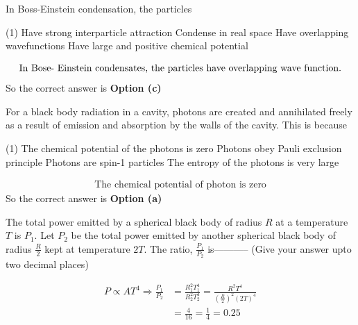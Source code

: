\begin{enumerate}
	\item In Boss-Einstein condensation, the particles
	{}
	\begin{tasks}(1)
		\task[\textbf{a.}] Have strong interparticle attraction
		\task[\textbf{b.}] Condense in real space
		\task[\textbf{c.}]  Have overlapping wavefunctions
		\task[\textbf{d.}] Have large and positive chemical potential
	\end{tasks}
	\begin{answer}
		\begin{align*}
		\intertext{In Bose- Einstein condensates, the particles have overlapping wave function.}
		\end{align*}
		So the correct answer is \textbf{Option (c)}
	\end{answer}
	\begin{minipage}{\textwidth}
		\item For a black body radiation in a cavity, photons are created and annihilated freely as a result of emission and absorption by the walls of the cavity. This is because
		{}
	\end{minipage}
	\begin{tasks}(1)
		\task[\textbf{a.}] The chemical potential of the photons is zero
		\task[\textbf{b.}] Photons obey Pauli exclusion principle
		\task[\textbf{c.}] Photons are spin-1 particles
		\task[\textbf{d.}] The entropy of the photons is very large
	\end{tasks}
	\begin{answer}
		\begin{align*}
		\text{The chemical potential of photon is zero}
		\end{align*}
		So the correct answer is \textbf{Option (a)}
	\end{answer}
	\item The total power emitted by a spherical black body of radius $R$ at a temperature $T$ is $P_{1}$. Let $P_{2}$ be the total power emitted by another spherical black body of radius $\frac{R}{2}$ kept at temperature $2 T$. The ratio, $\frac{P_{1}}{P_{2}}$ is----------- (Give your answer upto two decimal places)
	{}
	\begin{answer}
		\begin{align*}
		P \propto A T^{4} \Rightarrow \frac{P_{1}}{P_{2}}&=\frac{R_{1}^{2} T_{1}^{4}}{R_{2}^{2} T_{2}^{4}}=\frac{R^{2} T^{4}}{\left(\frac{R}{2}\right)^{2}(2 T)^{4}}\\&=\frac{4}{16}=\frac{1}{4}=0.25
		\end{align*}

\end{answer}
\end{enumerate}
